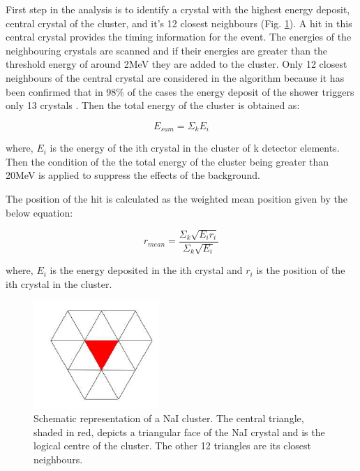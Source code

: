 \indent First step in the analysis is to identify a crystal with the highest energy deposit, central crystal of the cluster, and it's 12 closest neighbours (Fig. \ref{cbcluster}). A hit in this central crystal provides the timing information for the event. The energies of the neighbouring crystals are scanned and if their energies are greater than the threshold energy of around 2MeV they are added to the cluster. Only 12 closest neighbours of the central crystal are considered in the algorithm because it has been confirmed that in 98\% of the cases the energy deposit of the shower triggers only 13 crystals \cite{claire}. Then the total energy of the cluster is obtained as:

\begin{equation}
E_{sum}=\Sigma_{k}E_{i}
\end{equation}

where, $E_{i}$ is the energy of the ith crystal in the cluster of k detector elements. Then the condition of the the total energy of the cluster being greater than 20MeV  is applied to suppress the effects of the background.

\indent The position of the hit is calculated as the weighted mean position given by the below equation:

\begin{equation}
r_{mean}=\frac{\Sigma_{k}\sqrt{E_{i}r_{i}}}{\Sigma_{k}\sqrt{E_{i}}}
\end{equation}

where, $E_{i}$ is the energy deposited in the ith crystal and $r_{i}$ is the position of the ith crystal in the cluster.

\begin{figure}[H]
\begin{center}
\includegraphics[scale=0.55]{cbcluster.png}
\caption{Schematic representation of a NaI cluster. The central triangle, shaded in red, depicts a triangular face of the NaI crystal and is the logical centre of the cluster. The other 12 triangles are its closest neighbours.}
\label{cbcluster}
\end{center}
\end{figure}

